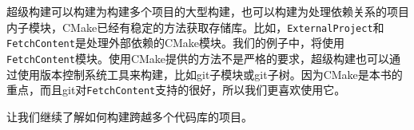 超级构建可以构建为构建多个项目的大型构建，也可以构建为处理依赖关系的项目内子模块，CMake已经有稳定的方法获取存储库。比如，\texttt{ExternalProject}和\texttt{FetchContent}是处理外部依赖的CMake模块。我们的例子中，将使用\texttt{FetchContent}模块。使用CMake提供的方法不是严格的要求，超级构建也可以通过使用版本控制系统工具来构建，比如git子模块或git子树。因为CMake是本书的重点，而且git对\texttt{FetchContent}支持的很好，所以我们更喜欢使用它。

让我们继续了解如何构建跨越多个代码库的项目。